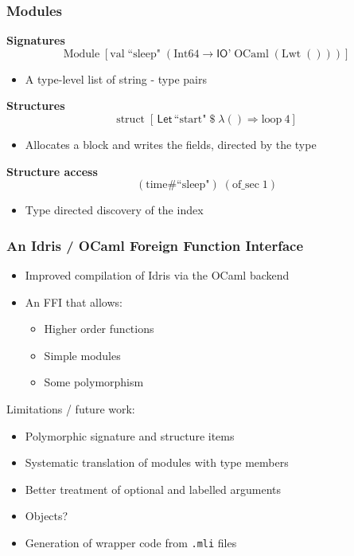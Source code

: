 \documentclass[aspectratio=169]{beamer}
\begin{document}
\begin{frame}[t]
  \frametitle{Modules}

  {\bf Signatures} 
  \begin{displaymath}
    \textrm{Module}\;[\mathrm{val}\;\textrm{``sleep"}\;(\mathrm{Int64} \to \textsf{IO'}\;\mathrm{OCaml}\;(\mathrm{Lwt}\;()))]
  \end{displaymath}
  \begin{itemize}
  \item A type-level list of string - type pairs
  \end{itemize}

  \bigskip
  \pause

  {\bf Structures}
  \begin{displaymath}
    \textrm{struct}\;[\,\textsf{Let}\,\textrm{``start"} \; \$ \; \lambda () \Rightarrow \mathrm{loop}~4 ]
  \end{displaymath}
  \begin{itemize}
  \item Allocates a block and writes the fields, directed by the type
  \end{itemize}

  \bigskip
  \pause

  {\bf Structure access}
  \begin{displaymath}
    (\textrm{time}\#\textrm{``sleep"})\; (\mathrm{of\_sec}\; 1)
  \end{displaymath}
  \begin{itemize}
  \item Type directed discovery of the index
  \end{itemize}
\end{frame}


\begin{frame}[t]
  \frametitle{An Idris / OCaml Foreign Function Interface}

  \begin{itemize}
  \item Improved compilation of Idris via the OCaml backend
  \item An FFI that allows:
    \begin{itemize}
    \item Higher order functions
    \item Simple modules
    \item Some polymorphism
    \end{itemize}
  \end{itemize}

  \bigskip
  \pause

  Limitations / future work:
  \begin{itemize}
  \item Polymorphic signature and structure items
  \item Systematic translation of modules with type members
  \item Better treatment of optional and labelled arguments
  \item Objects?
  \item Generation of wrapper code from \texttt{.mli} files
  \end{itemize}
\end{frame}
\end{document}
